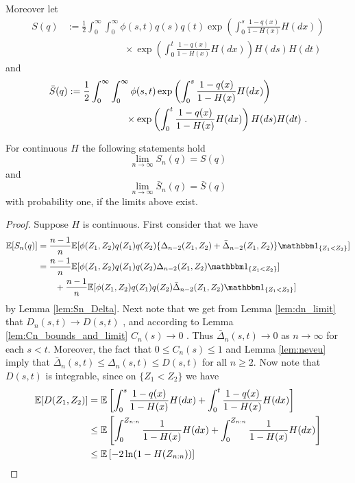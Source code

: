 Moreover let
\begin{align*}
	S(q) &:= \frac{1}{2}\int_{0}^{\infty} \int_{0}^{\infty} \phi(s,t) q(s)q(t) \exp\left(\int_{0}^{s} \frac{1-q(x)}{1-H(x)} H(dx)\right)\\
	&\qquad\qquad\qquad \times \exp\left(\int_{0}^{t} \frac{1-q(x)}{1-H(x)} H(dx) \right)H(ds)H(dt)
\end{align*}
and 
\begin{align*}
	\bar{S}(q) &:= \frac{1}{2}\int_{0}^{\infty} \int_{0}^{\infty} \phi(s,t)  \exp\left(\int_{0}^{s} \frac{1-q(x)}{1-H(x)} H(dx)\right)\\
	&\qquad\qquad\qquad \times \exp\left(\int_{0}^{t} \frac{1-q(x)}{1-H(x)} H(dx) \right)H(ds)H(dt)\textrm{ .}
\end{align*}

\begin{lemma}
	For continuous $H$ the following statements hold
	$$\lim\limits_{n\to\infty} S_n(q) = S(q)$$
	and 
	$$\lim\limits_{n\to\infty} \bar{S}_n(q) = \bar{S}(q)$$
	with probability one, if the limits above exist.
	\label{lem:sn_limit}
	\begin{proof}
		Suppose $H$ is continuous. First consider that we have
		\begin{align*}
			\E[S_n(q)] &= \frac{n-1}{n} \E[\phi(Z_1,Z_2)q(Z_1)q(Z_2)\{\Delta_{n-2}(Z_1, Z_2) + \bar\Delta_{n-2}(Z_1, Z_2)\} \I{Z_1<Z_2}]	\\
			&= \frac{n-1}{n} \E[\phi(Z_1,Z_2)q(Z_1)q(Z_2)\Delta_{n-2}(Z_1, Z_2)\I{Z_1<Z_2}]\\
			&\qquad + \frac{n-1}{n} \E[\phi(Z_1,Z_2)q(Z_1)q(Z_2) \bar\Delta_{n-2}(Z_1, Z_2) \I{Z_1<Z_2}]
		\end{align*}
		by Lemma \ref{lem:Sn_Delta}. 
		Next note that we get from Lemma \ref{lem:dn_limit} that $D_n(s,t) \to D(s,t)$ \wpo, and according to Lemma \ref{lem:Cn_bounds_and_limit} $C_n(s) \to 0$ \wpo. Thus $\bar{\Delta}_n(s,t) \to 0$ as $n\to\infty$ for each $s<t$.
		Moreover, the fact that $0\leq C_n(s)\leq 1$ and Lemma \ref{lem:neveu} imply that $\bar{\Delta}_n(s,t) \leq \Delta_n(s,t) \leq D(s,t)$ for all $n\geq 2$. Now note that $D(s,t)$ is integrable, since on $\{Z_1<Z_2\}$ we have
		\begin{align*}
			\E[D(Z_1,Z_2)] &= \E\left[\int_{0}^{s} \frac{1-q(x)}{1-H(x)} H(dx) + \int_{0}^{t} \frac{1-q(x)}{1-H(x)} H(dx)\right]\\
			&\leq \E\left[\int_{0}^{Z_{n:n}} \frac{1}{1-H(x)} H(dx) + \int_{0}^{Z_{n:n}} \frac{1}{1-H(x)} H(dx)\right]\\
			&\leq \E\left[-2\ln(1-H(Z_{n:n}))\right]\\

\end{align*}
\end{proof}
\end{lemma}
